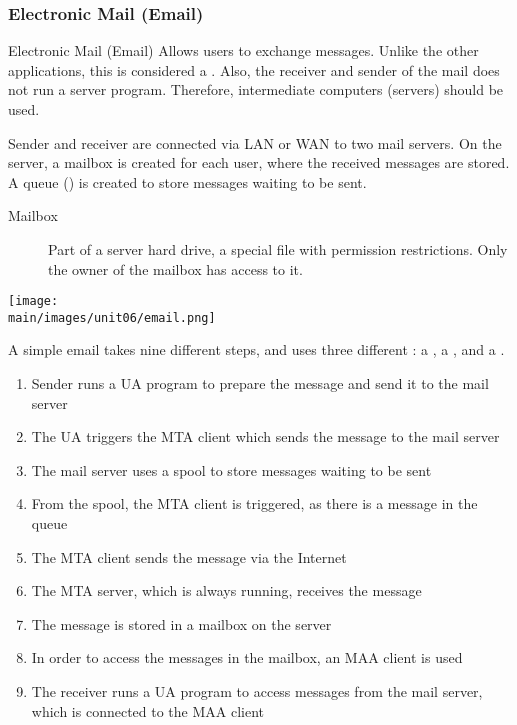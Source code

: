 \documentclass[\main/notes.tex]{subfiles}
\begin{document}
				\subsubsection{Electronic Mail (Email)}
					\begin{definition}{Electronic Mail (Email)}
						Allows users to exchange messages. Unlike the other applications, this is considered a . Also, the receiver and sender of the mail does not run a server program. Therefore, intermediate computers (servers) should be used.

						Sender and receiver are connected via LAN or WAN to two mail servers. On the server, a mailbox is created for each user, where the received messages are stored. A queue () is created to store messages waiting to be sent.
						\begin{indentparagraph}
							\begin{description}
								\item[Mailbox] Part of a server hard drive, a special file with permission restrictions. Only the owner of the mailbox has access to it.
							\end{description}
						\end{indentparagraph}
						\begin{center}
							\texttt{[image: \\main/images/unit06/email.png]}
						\end{center}
						A simple email takes nine different steps, and uses three different : a , a , and a .
						\begin{enumerate}
							\item Sender runs a UA program to prepare the message and send it to the mail server
							\item The UA triggers the MTA client which sends the message to the mail server
							\item The mail server uses a spool to store messages waiting to be sent
							\item From the spool, the MTA client is triggered, as there is a message in the queue
							\item The MTA client sends the message via the Internet
							\item The MTA server, which is always running, receives the message
							\item The message is stored in a mailbox on the server
							\item In order to access the messages in the mailbox, an MAA client is used
							\item The receiver runs a UA program to access messages from the mail server, which is connected to the MAA client
						\end{enumerate}
					\end{definition}
\end{document}

